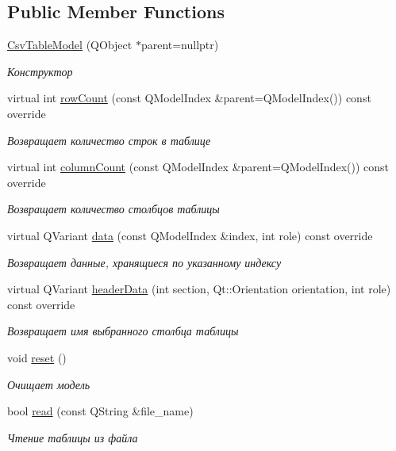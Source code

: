 \subsection*{Public Member Functions}
\begin{DoxyCompactItemize}
\item 
\mbox{\hyperlink{class_csv_table_model_ace3bbe6a48fe262b451dfe5f33577e96}{Csv\+Table\+Model}} (Q\+Object $\ast$parent=nullptr)
\begin{DoxyCompactList}\small\item\em Конструктор \end{DoxyCompactList}\item 
virtual int \mbox{\hyperlink{class_csv_table_model_a91cc21d209c0b9ba8143aa033450bc6e}{row\+Count}} (const Q\+Model\+Index \&parent=Q\+Model\+Index()) const override
\begin{DoxyCompactList}\small\item\em Возвращает количество строк в таблице \end{DoxyCompactList}\item 
virtual int \mbox{\hyperlink{class_csv_table_model_a750aedb5638fc8e04e9a6e530a119f91}{column\+Count}} (const Q\+Model\+Index \&parent=Q\+Model\+Index()) const override
\begin{DoxyCompactList}\small\item\em Возвращает количество столбцов таблицы \end{DoxyCompactList}\item 
virtual Q\+Variant \mbox{\hyperlink{class_csv_table_model_a86cfc5e15808768e3517f5183e7d5fbb}{data}} (const Q\+Model\+Index \&index, int role) const override
\begin{DoxyCompactList}\small\item\em Возвращает данные, хранящиеся по указанному индексу \end{DoxyCompactList}\item 
virtual Q\+Variant \mbox{\hyperlink{class_csv_table_model_ae5790a6d1cbfcfdf7b8b5a4ce4a63748}{header\+Data}} (int section, Qt\+::\+Orientation orientation, int role) const override
\begin{DoxyCompactList}\small\item\em Возвращает имя выбранного столбца таблицы \end{DoxyCompactList}\item 
\mbox{\label{class_csv_table_model_a24f940138776feeed8d5884731a2cea4}} 
void \mbox{\hyperlink{class_csv_table_model_a24f940138776feeed8d5884731a2cea4}{reset}} ()
\begin{DoxyCompactList}\small\item\em Очищает модель \end{DoxyCompactList}\item 
bool \mbox{\hyperlink{class_csv_table_model_a05af2e7652238643f3f54c964eec2ec2}{read}} (const Q\+String \&file\+\_\+name)
\begin{DoxyCompactList}\small\item\em Чтение таблицы из файла \end{DoxyCompactList}\end{DoxyCompactItemize}


